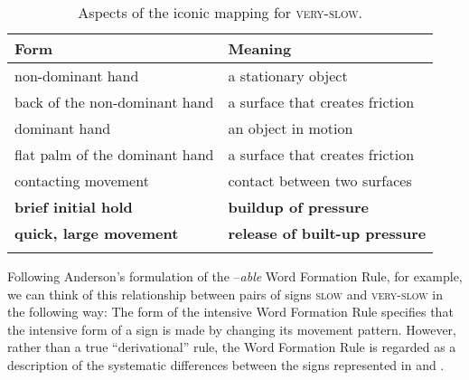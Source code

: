 \documentclass[output=paper,
modfonts
]{LSP/langsci}
\begin{document}
\begin{table}
\caption{Aspects of the iconic mapping for \textsc{very-slow}.}
\label{tab:2}

\begin{tabular}{ll}
\lsptoprule
Form & Meaning\\
\midrule
non-dominant hand & a stationary object\\

back of the non-dominant hand & a surface that creates friction\\

dominant hand & an object in motion\\

flat palm of the dominant hand & a surface that creates friction\\

contacting movement & contact between two surfaces\\

\textbf{brief initial hold} & \textbf{buildup of pressure}\\

\textbf{quick, large movement} & \textbf{release of built-up pressure}\\
\lspbottomrule
\end{tabular}
\end{table}

  Following Anderson's \citeyearpar[186]{anderson1992} formulation of the –\textit{able} Word Formation Rule, for example, we can think of this relationship between pairs of signs \textsc{slow} and \textsc{very-slow} in the following way:\textsc{} The form of the intensive Word Formation Rule specifies that the intensive form of a sign is made by changing its movement pattern. However, rather than a true ``derivational'' rule, the Word Formation Rule is regarded as a description of the systematic differences between the signs represented in  and .
\end{document}
